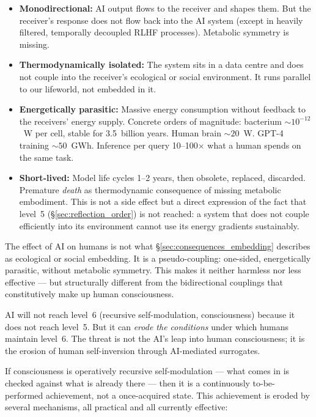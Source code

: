 \begin{itemize}
\item \textbf{Monodirectional:} AI output flows to the receiver and shapes them. But the receiver's response does not flow back into the AI system (except in heavily filtered, temporally decoupled RLHF processes). Metabolic symmetry is missing.
\item \textbf{Thermodynamically isolated:} The system sits in a data centre and does not couple into the receiver's ecological or social environment. It runs parallel to our lifeworld, not embedded in it.
\item \textbf{Energetically parasitic:} Massive energy consumption without feedback to the receivers' energy supply. Concrete orders of magnitude: bacterium $\sim 10^{-12}$~W per cell, stable for 3.5~billion years. Human brain $\sim 20$~W. GPT-4 training $\sim 50$~GWh. Inference per query 10--100$\times$ what a human spends on the same task.
\item \textbf{Short-lived:} Model life cycles 1--2 years, then obsolete, replaced, discarded. Premature \emph{death} as thermodynamic consequence of missing metabolic embodiment. This is not a side effect but a direct expression of the fact that level~5 (\S\ref{sec:reflection_order}) is not reached: a system that does not couple efficiently into its environment cannot use its energy gradients sustainably.
\end{itemize}

\begin{important}
The effect of AI on humans is not what \S\ref{sec:consequences_embedding} describes as ecological or social embedding. It is a pseudo-coupling: one-sided, energetically parasitic, without metabolic symmetry. This makes it neither harmless nor less effective --- but structurally different from the bidirectional couplings that constitutively make up human consciousness.
\end{important}

\begin{important}
AI will not reach level~6 (recursive self-modulation, consciousness) because it does not reach level~5. But it can \emph{erode the conditions} under which humans maintain level~6. The threat is not the AI's leap into human consciousness; it is the erosion of human self-inversion through AI-mediated surrogates.
\end{important}

If consciousness is operatively recursive self-modulation --- what comes in is checked against what is already there --- then it is a continuously to-be-performed achievement, not a once-acquired state. This achievement is eroded by several mechanisms, all practical and all currently effective:


